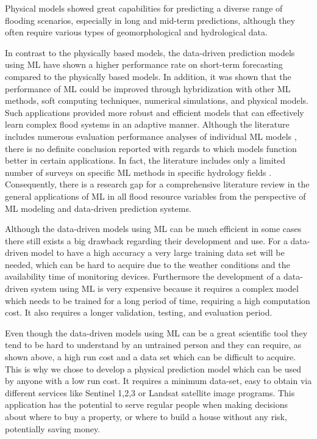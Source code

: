 \documentclass[12pt, a4paper]{report}
\begin{document}
Physical models showed great capabilities for predicting a diverse range of flooding scenarios\cite{Nayak}, especially in long and mid-term predictions, although they often require various types of geomorphological and  hydrological data. 
\par 

In contrast to the physically based models, the data-driven prediction models using ML have shown a higher performance rate on  short-term forecasting compared to the physically based models. In addition, it was shown that the performance of ML could be improved through hybridization with other ML methods, soft computing techniques, numerical simulations, and physical models. Such applications provided more robust and efficient models that can effectively learn complex flood systems in an adaptive manner. Although the literature includes numerous evaluation performance analyses of individual ML models \cite{Taherei, Kasiviswanathan, Ravansalar, Mosavi}, there is no definite conclusion reported with regards to which models function better in certain applications. In fact, the literature includes only a limited number of surveys on specific ML methods in specific hydrology fields \cite{Dandagala, Deka, Fotovatikhah}. Consequently, there is a research gap for a comprehensive literature review in the general applications of ML in all flood resource variables from the perspective of ML modeling and data-driven prediction systems.
\par 

Although the data-driven models using ML can be much efficient in some cases there still exists a big drawback regarding their development and use. For a data-driven model to have a high accuracy a very large training data set will be needed, which can be hard to acquire due to the weather conditions and the availability time of monitoring devices. Furthermore the development of a data-driven system using ML is very expensive because it requires a complex model which needs to be trained for a long period of time, requiring a high computation cost. It also requires a longer validation, testing, and evaluation period.
\par

Even though the data-driven models using ML can be a great scientific tool they tend to be hard to understand by an untrained person and they can require, as shown above, a high run cost and a data set which can be difficult to acquire. This is why we chose to develop a physical prediction model which can be used by anyone with a low run cost. It requires a minimum data-set, easy to obtain via different services like Sentinel 1,2,3 or Landsat satellite image programs. This application has the potential to serve regular people when making decisions about where to buy a property, or where to build a house without any risk, potentially saving money.
\par
\end{document}
